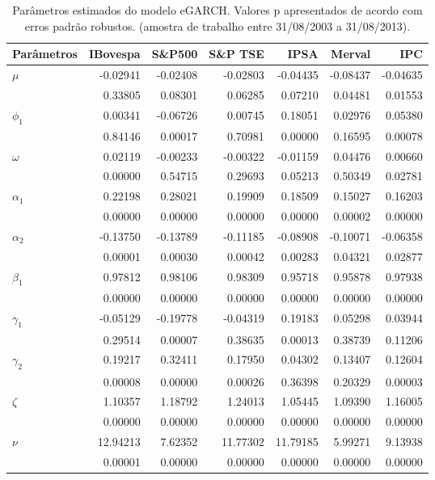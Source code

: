\begin{table}[H]
\centering
\caption{Par\^ametros estimados do modelo eGARCH. Valores p apresentados 
               de acordo com erros padrão robustos. (amostra de trabalho entre 31/08/2003 a 31/08/2013).} 
\label{tab:garchcoef}
\begin{tabular}{lrrrrrr}
  \hline
Parâmetros & IBovespa & S\&P500 & S\&P TSE & IPSA & Merval & IPC \\ 
  \hline
$\mu$ & -0.02941 & -0.02408 & -0.02803 & -0.04435 & -0.08437 & -0.04635 \\ 
   & 0.33805 & 0.08301 & 0.06285 & 0.07210 & 0.04481 & 0.01553 \\ 
  $\phi_1$ & 0.00341 & -0.06726 & 0.00745 & 0.18051 & 0.02976 & 0.05380 \\ 
   & 0.84146 & 0.00017 & 0.70981 & 0.00000 & 0.16595 & 0.00078 \\ 
  $\omega$ & 0.02119 & -0.00233 & -0.00322 & -0.01159 & 0.04476 & 0.00660 \\ 
   & 0.00000 & 0.54715 & 0.29693 & 0.05213 & 0.50349 & 0.02781 \\ 
  $\alpha_1$ & 0.22198 & 0.28021 & 0.19909 & 0.18509 & 0.15027 & 0.16203 \\ 
   & 0.00000 & 0.00000 & 0.00000 & 0.00000 & 0.00002 & 0.00000 \\ 
  $\alpha_2$ & -0.13750 & -0.13789 & -0.11185 & -0.08908 & -0.10071 & -0.06358 \\ 
   & 0.00001 & 0.00030 & 0.00042 & 0.00283 & 0.04321 & 0.02877 \\ 
  $\beta_1$ & 0.97812 & 0.98106 & 0.98309 & 0.95718 & 0.95878 & 0.97938 \\ 
   & 0.00000 & 0.00000 & 0.00000 & 0.00000 & 0.00000 & 0.00000 \\ 
  $\gamma_1$ & -0.05129 & -0.19778 & -0.04319 & 0.19183 & 0.05298 & 0.03944 \\ 
   & 0.29514 & 0.00007 & 0.38635 & 0.00013 & 0.38739 & 0.11206 \\ 
  $\gamma_2$ & 0.19217 & 0.32411 & 0.17950 & 0.04302 & 0.13407 & 0.12604 \\ 
   & 0.00008 & 0.00000 & 0.00026 & 0.36398 & 0.20329 & 0.00003 \\ 
  $\zeta$ & 1.10357 & 1.18792 & 1.24013 & 1.05445 & 1.09390 & 1.16005 \\ 
   & 0.00000 & 0.00000 & 0.00000 & 0.00000 & 0.00000 & 0.00000 \\ 
  $\nu$ & 12.94213 & 7.62352 & 11.77302 & 11.79185 & 5.99271 & 9.13938 \\ 
   & 0.00001 & 0.00000 & 0.00000 & 0.00000 & 0.00000 & 0.00000 \\ 
   \hline
\end{tabular}
\end{table}
